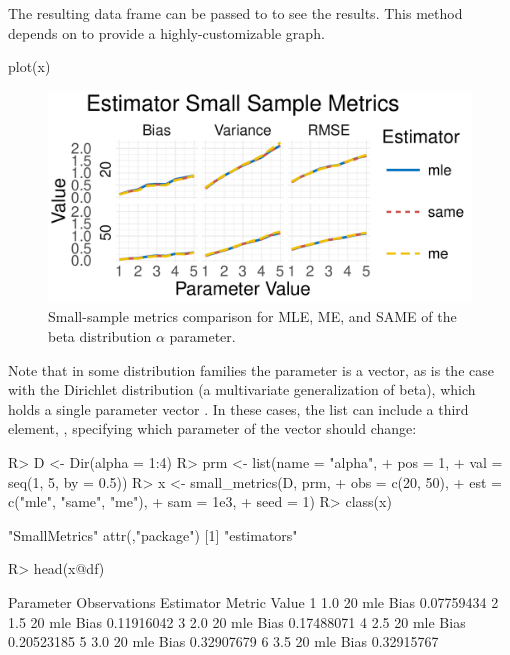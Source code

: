 \documentclass[nojss]{jss}
\newcommand{\fct}[1]{\code{#1()}}
\begin{document}
The resulting data frame can be passed to \fct{plot} to see the results. This \fct{plot} method depends on  to provide a highly-customizable graph.

\begin{CodeChunk}
\begin{CodeInput}
plot(x)
\end{CodeInput}
\end{CodeChunk}

\begin{figure}[t!]
\centering
\includegraphics{estimators-vis_small_beta}
  \caption{\label{fig:vis-small-beta} Small-sample metrics comparison for MLE, ME, and SAME of the beta distribution $\alpha$ parameter.}
\end{figure}

Note that in some distribution families the parameter is a vector, as is the case with the Dirichlet distribution (a multivariate generalization of beta), which holds a single parameter vector . In these cases, the  list can include a third element, , specifying which parameter of the vector should change:

\begin{Schunk}
\begin{Sinput}
R> D <- Dir(alpha = 1:4)
R> prm <- list(name = "alpha",
+              pos = 1,
+              val = seq(1, 5, by = 0.5))
R> x <- small_metrics(D, prm,
+                     obs = c(20, 50),
+                     est = c("mle", "same", "me"),
+                     sam = 1e3,
+                     seed = 1)
R> class(x)
\end{Sinput}
\begin{Soutput}
[1] "SmallMetrics"
attr(,"package")
[1] "estimators"
\end{Soutput}
\begin{Sinput}
R> head(x@df)
\end{Sinput}
\begin{Soutput}
  Parameter Observations Estimator Metric      Value
1       1.0           20       mle   Bias 0.07759434
2       1.5           20       mle   Bias 0.11916042
3       2.0           20       mle   Bias 0.17488071
4       2.5           20       mle   Bias 0.20523185
5       3.0           20       mle   Bias 0.32907679
6       3.5           20       mle   Bias 0.32915767
\end{Soutput}
\end{Schunk}
\end{document}
